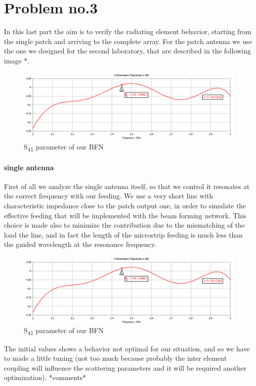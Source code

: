 \section{Problem no.3}
In this last part the aim is to verify the radiating element behavior, starting from the single patch and arriving to the complete array. For the patch antenna we use the one we designed for the second laboratory, that are described in the following image *.
\begin{figure}[H]
	\centering
	\includegraphics[scale=0.35]{S41Amp.png}
	\caption{S\textsubscript{41} parameter of our BFN}
	\label{S41Amp}
\end{figure}

\paragraph{single antenna} First of all we analyze the single antenna itself, so that we control it resonates at the correct frequency with our feeding. We use a very short line with characteristic impedance close to the patch output one, in order to simulate the effective feeding that will be implemented with the beam forming network. This choice is made also to minimize the contribution due to the mismatching of the load the line, and in fact the length of the microstrip feeding is much less than the guided wavelength at the resonance frequency.
\begin{figure}[H]
	\centering
	\includegraphics[scale=0.35]{S41Amp.png}
	\caption{S\textsubscript{41} parameter of our BFN}
	\label{S41Amp}
\end{figure}
The initial values shows a behavior not optimal for our situation, and so we have to made a little tuning (not too much because probably the inter element coupling will influence the scattering parameters and it will be required another optimization). *comments*

